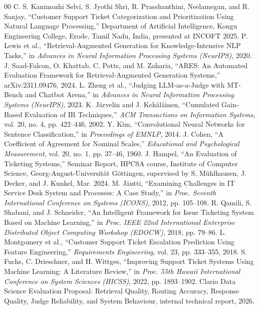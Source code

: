 \documentclass[conference]{IEEEtran}
\begin{document}
\begin{thebibliography}{00}
 C. S. Kanimozhi Selvi, S. Jyothi Shri, R. Prasshanthini, Neelamegan, and R. Sanjay, ``Customer Support Ticket Categorization and Prioritization Using Natural Language Processing,'' Department of Artificial Intelligence, Kongu Engineering College, Erode, Tamil Nadu, India, presented at INCOFT 2025.
 P. Lewis et al., ``Retrieval-Augmented Generation for Knowledge-Intensive NLP Tasks,'' in \emph{Advances in Neural Information Processing Systems (NeurIPS)}, 2020.
 J. Saad-Falcon, O. Khattab, C. Potts, and M. Zaharia, ``ARES: An Automated Evaluation Framework for Retrieval-Augmented Generation Systems,'' arXiv:2311.09476, 2024.
 L. Zheng et al., ``Judging LLM-as-a-Judge with MT-Bench and Chatbot Arena,'' in \emph{Advances in Neural Information Processing Systems (NeurIPS)}, 2023.
 K. J{\"a}rvelin and J. Kek{\"a}l{\"a}inen, ``Cumulated Gain-Based Evaluation of IR Techniques,'' \emph{ACM Transactions on Information Systems}, vol. 20, no. 4, pp. 422--446, 2002.
 Y. Kim, ``Convolutional Neural Networks for Sentence Classification,'' in \emph{Proceedings of EMNLP}, 2014.
 J. Cohen, ``A Coefficient of Agreement for Nominal Scales,'' \emph{Educational and Psychological Measurement}, vol. 20, no. 1, pp. 37--46, 1960.
 J. Hampel, ``An Evaluation of Ticketing Systems,'' Seminar Report, HPCSA course, Institute of Computer Science, Georg-August-Universit{\"a}t G{\"o}ttingen, supervised by S. M{\"u}hlhausen, J. Decker, and J. Kunkel, Mar. 2024.
 M. J{\"a}ntti, ``Examining Challenges in IT Service Desk System and Processes: A Case Study,'' in \emph{Proc. Seventh International Conference on Systems (ICONS)}, 2012, pp. 105--108.
 R. Qamili, S. Shabani, and J. Schneider, ``An Intelligent Framework for Issue Ticketing System Based on Machine Learning,'' in \emph{Proc. IEEE 22nd International Enterprise Distributed Object Computing Workshop (EDOCW)}, 2018, pp. 79--86.
 L. Montgomery et al., ``Customer Support Ticket Escalation Prediction Using Feature Engineering,'' \emph{Requirements Engineering}, vol. 23, pp. 333--355, 2018.
 S. Fuchs, C. Drieschner, and H. Wittges, ``Improving Support Ticket Systems Using Machine Learning: A Literature Review,'' in \emph{Proc. 55th Hawaii International Conference on System Sciences (HICSS)}, 2022, pp. 1893--1902.
 Clario Data Science Evaluation Proposal: Retrieval Quality, Routing Accuracy, Response Quality, Judge Reliability, and System Behaviour, internal technical report, 2026.
\end{thebibliography}
\end{document}

